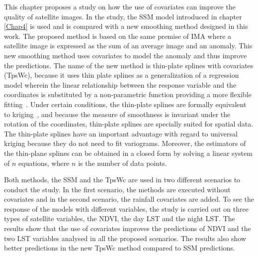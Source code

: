 This chapter proposes a study on how the use of covariates can improve the quality of satellite images. In the study, the SSM model introduced in chapter \ref{Chap4} is used and is compared with a new smoothing method designed in this work. The proposed method is based on the same premise of IMA where a satellite image is expressed as the sum of an average image and an anomaly. This new smoothing method uses covariates to model the anomaly and thus improve the predictions. The name of the new method is thin-plate splines with covariates (TpsWc), because it uses thin plate splines as a generalization of a regression model wherein the linear relationship between the response variable and the coordinates is substituted by a non-parametric function providing a more flexible fitting~\cite{whaba}. 
Under certain conditions, the thin-plate splines are formally equivalent to kriging~\cite{hutchinson1994splines}, and because the measure of smoothness is invariant under the rotation of the coordinates, thin-plate splines are specially suited for spatial data. 
The thin-plate splines have an important advantage with regard to universal kriging because they do not need to fit variograms. Moreover, the estimators of the thin-plane splines can be obtained in a closed form by solving a linear system of $n$ equations, where $n$ is the number of data points.

Both methods, the SSM and the TpsWc are used in two different scenarios to conduct the study. In the first scenario, the methods are executed without covariates and in the second scenario, the rainfall covariates are added. To see the response of the models with different variables, the study is carried out on three types of satellite variables, the NDVI, the day LST and the night LST. The results show that the use of covariates improves the predictions of NDVI and the two LST variables analysed in all the proposed scenarios. The results also show better predictions in the new TpsWc method compared to SSM predictions.




